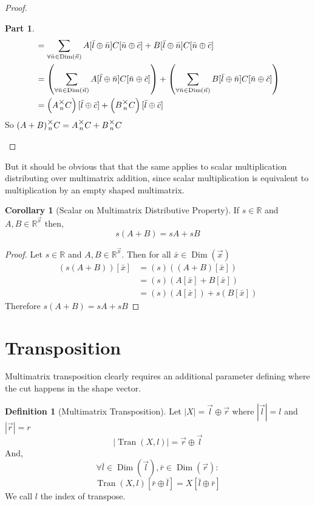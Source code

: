 \documentclass[12pt]{book}
\theoremstyle{plain}
\theoremstyle{definition}
\newtheorem{definition}{Definition}[chapter]
\newtheorem{corollary}{Corollary}[theorem]
\theoremstyle{ppart}
\newtheorem{ppart}{Part}
\theoremstyle{case}
\theoremstyle{solution}
\DeclareMathOperator{\Dim}{Dim}
\DeclareMathOperator{\Tran}{Tran}
\newcommand{\mmult}[1]{\text{\raisebox{1ex}{$\underset{#1}{\times}$}}}
\newcommand{\shape}[1]{\left|#1\right|}
\begin{document}
\begin{landscape}
\begin{proof}
\begin{ppart}
\begin{align*}
 &= \sum_{\forall \bar{n} \in \Dim(\vec{n})}
    A[\bar{l} \oplus \bar{n}]C[\bar{n} \oplus \bar{c}]
    +B[\bar{l} \oplus \bar{n}]C[\bar{n} \oplus \bar{c}] \\
 &= \left(\sum_{\forall \bar{n} \in \Dim(\vec{n})}
    A[\bar{l} \oplus \bar{n}]C[\bar{n} \oplus \bar{c}]\right)
    +
    \left(\sum_{\forall \bar{n} \in \Dim(\vec{n})}
    B[\bar{l} \oplus \bar{n}]C[\bar{n} \oplus \bar{c}]\right) \\
 &= \left(A \mmult{n} C\right)[\bar{l} \oplus \bar{c}]
    +\left(B \mmult{n} C\right)[\bar{l} \oplus \bar{c}]
\end{align*}
So $(A+B) \mmult{n} C = A \mmult{n} C + B \mmult{n} C$ 
\end{ppart}
\end{proof}
\end{landscape}

But it should be obvious that that the same applies to scalar 
multiplication distributing over multimatrix addition, since
scalar multiplication is equivalent to multiplication by an
empty shaped multimatrix.

\begin{corollary}[Scalar on Multimatrix Distributive Property]
If $s \in \mathbb{R}$ and $A, B \in \mathbb{R}^{\vec{x}}$ then,
\[ s(A + B) = sA + sB \]
\end{corollary}
\begin{proof}
Let $s \in \mathbb{R}$ and $A, B \in \mathbb{R}^{\vec{x}}$.
Then for all $\bar{x} \in \Dim(\vec{x})$
\begin{align*}
(s(A+B))[\bar{x}]
&= (s)((A+B)[\bar{x}]) \\
&= (s)(A[\bar{x}] + B[\bar{x}]) \\
&= (s)(A[\bar{x}]) + s(B[\bar{x}])
\end{align*}
Therefore $s(A+B) = sA + sB$
\end{proof}

\section{Transposition}

Multimatrix transposition clearly requires an additional parameter defining where
the cut happens in the shape vector.

\begin{definition}[Multimatrix Transposition]
\label{tran_def}
Let $\shape{X} = \vec{l} \oplus \vec{r}$ where $\shape{\vec{l}} = l$ and $\shape{\vec{r}} = r$
\[ \shape{\Tran(X, l)} = \vec{r} \oplus \vec{l} \]
And,
\[ \forall \bar{l} \in \Dim(\vec{l}), \bar{r} \in \Dim(\vec{r}) : \]
\[ \Tran(X, l)[\bar{r} \oplus \bar{l}] = X[\bar{l} \oplus \bar{r}] \]
We call $l$ the index of transpose.
\end{definition}
\end{document}
